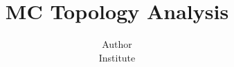 \documentclass[11pt]{article}
\begin{document}
\title{MC Topology Analysis}
\author{Author\\
\small{Institute}}
\maketitle
\end{document}
